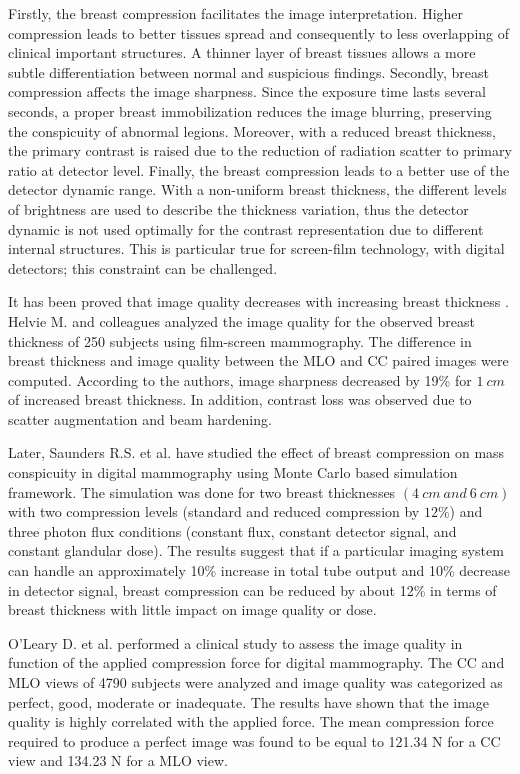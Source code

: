  Firstly, the breast compression facilitates the image interpretation. Higher compression leads to better tissues spread and consequently to less overlapping of clinical important structures. A thinner layer of breast tissues allows a more subtle differentiation between normal and suspicious findings. Secondly, breast compression affects the image sharpness. Since the exposure time lasts several seconds, a proper breast immobilization reduces the image blurring, preserving the conspicuity of abnormal legions. Moreover, with a reduced breast thickness, the primary contrast is raised due to the reduction of radiation scatter to primary ratio at detector level. Finally, the breast compression leads to a better use of the detector dynamic range. With a non-uniform breast thickness, the different levels of brightness are used to describe the thickness variation, thus the detector dynamic is not used optimally for the contrast representation due to different internal structures. This is particular true for screen-film technology, with digital detectors; this constraint can be challenged.

It has been proved that image quality decreases with increasing breast thickness \citep{ko_dose_2013,helvie_breast_1994,saunders_effect_2008,poulos_breast_2003}. Helvie M. and colleagues \citep{helvie_breast_1994} analyzed the image quality for the observed breast thickness of 250 subjects using film-screen mammography.  The difference in breast thickness and image quality between the MLO and CC paired images were computed. According to the authors, image sharpness decreased by 19\% for $1\ cm$ of increased breast thickness. In addition, contrast loss was observed due to scatter augmentation and beam hardening.

Later, Saunders R.S. et al. \citep{saunders_effect_2008} have studied the effect of breast compression on mass conspicuity in digital mammography using Monte Carlo based simulation framework. The simulation was done for two breast thicknesses $(4\ cm\ and\ 6\ cm)$ with two compression levels (standard and reduced compression by $12\%$) and three photon flux conditions (constant
flux, constant detector signal, and constant glandular dose). The results suggest that if a particular imaging system can handle an approximately 10\% increase in total tube output and 10\% decrease in detector signal, breast compression can be reduced by about 12\% in terms of breast thickness with little impact on image quality or dose.

O'Leary D. et al. \cite{oleary_compression_2011} performed a clinical study to assess the image quality in function of the applied compression force for digital mammography. The CC and MLO views of 4790 subjects were analyzed and image quality was categorized as  perfect, good, moderate or
inadequate. The results have shown that the image quality is highly correlated with the applied force. The mean compression force required to produce a perfect image was found to be equal to 121.34 N for a CC view and 134.23 N for a MLO view.

